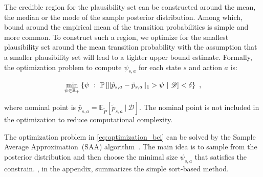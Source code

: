\documentclass{article}
\DeclarePairedDelimiter{\norm}{\lVert}{\rVert}
\newcommand{\E}{\mathbb{E}}
\renewcommand{\P}{\mathbb{P}}
\newcommand{\Real}{\mathbb{R}}
\renewcommand{\ss}{~:~}
\theoremstyle{plain}
\theoremstyle{definition}
\begin{document}
The credible region for the plausibility set can be constructed around
the mean, the median or the mode of the sample posterior distribution.
Among which, bound around the empirical mean of the transition
probabilities is simple and more common. To construct such a region,
we optimize for the smallest plausibility set around the mean
transition probability with the assumption that a smaller plausibility
set will lead to a tighter upper bound estimate.  Formally, the
optimization problem to compute $\psi_{s,a}$ for each state $s$ and
action $a$ is:

\begin{equation} \label{eq:optimization_bci}
\min_{\psi\in\Real_+} \left\{\psi \ss \P\left[ \norm{\tilde{p}_{s,a} - \bar{p}_{s,a}}_1 > \psi ~|~ \mathcal{D} \right] < \delta \right\}~,
\end{equation}

where nominal point is $\bar{p}_{s,a} = \E_{\tilde{P}}[\tilde{p}_{s,a} ~|~ \mathcal{D}]$. The nominal point is not included in the optimization to reduce computational complexity. 

The optimization problem in \cref{eq:optimization_bci} can be solved by the Sample Average Approximation~(SAA) algorithm~\citep{Shapiro2014}. The main idea is to sample from the posterior distribution and then choose the minimal size $\psi_{s,a}$ that satisfies the constrain.  , in the appendix, summarizes the simple sort-based method.
\end{document}
